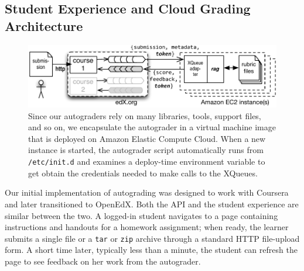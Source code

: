 \subsection{Student Experience and Cloud Grading Architecture}

\begin{figure}
  \centering
  \includegraphics[width=\textwidth]{figs/autograder_arch.pdf}
  \caption{\label{fig:autograder_arch}
  Since our autograders rely on many libraries,
  tools, support files, and so on, we encapsulate the autograder in a
  virtual machine image that is deployed on Amazon Elastic Compute Cloud.
  When a new instance is started, the autograder script automatically runs from
  \texttt{/etc/init.d} and examines a deploy-time environment variable
  to get obtain the credentials needed to make calls to the XQueues.}
\end{figure}


Our initial implementation of autograding was designed to work with
Coursera and later transitioned to OpenEdX.  Both the API and the student
experience are similar 
between the two.  A logged-in student navigates to a page
containing instructions and handouts for a homework assignment;
when ready, the learner submits a single file or a
\texttt{tar} or \texttt{zip} archive through a standard HTTP
file-upload form.  A short time later, typically less than a minute, the
student can refresh the page to see feedback on her work from the
autograder.  

